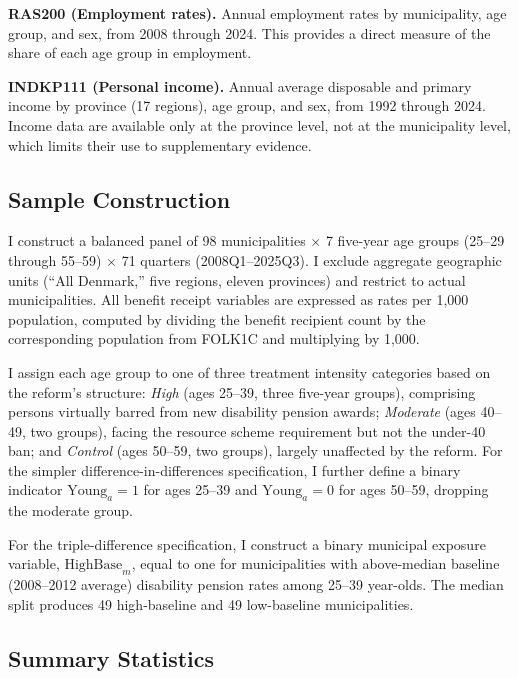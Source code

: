 \documentclass[12pt]{article}
\begin{document}
\textbf{RAS200 (Employment rates).} Annual employment rates by municipality, age group, and sex, from 2008 through 2024. This provides a direct measure of the share of each age group in employment.

\textbf{INDKP111 (Personal income).} Annual average disposable and primary income by province (17 regions), age group, and sex, from 1992 through 2024. Income data are available only at the province level, not at the municipality level, which limits their use to supplementary evidence.

\subsection{Sample Construction}

I construct a balanced panel of 98 municipalities $\times$ 7 five-year age groups (25--29 through 55--59) $\times$ 71 quarters (2008Q1--2025Q3). I exclude aggregate geographic units (``All Denmark,'' five regions, eleven provinces) and restrict to actual municipalities. All benefit receipt variables are expressed as rates per 1,000 population, computed by dividing the benefit recipient count by the corresponding population from FOLK1C and multiplying by 1,000.

I assign each age group to one of three treatment intensity categories based on the reform's structure: \textit{High} (ages 25--39, three five-year groups), comprising persons virtually barred from new disability pension awards; \textit{Moderate} (ages 40--49, two groups), facing the resource scheme requirement but not the under-40 ban; and \textit{Control} (ages 50--59, two groups), largely unaffected by the reform. For the simpler difference-in-differences specification, I further define a binary indicator $\text{Young}_a = 1$ for ages 25--39 and $\text{Young}_a = 0$ for ages 50--59, dropping the moderate group.

For the triple-difference specification, I construct a binary municipal exposure variable, $\text{HighBase}_m$, equal to one for municipalities with above-median baseline (2008--2012 average) disability pension rates among 25--39 year-olds. The median split produces 49 high-baseline and 49 low-baseline municipalities.

\subsection{Summary Statistics}


\end{document}
